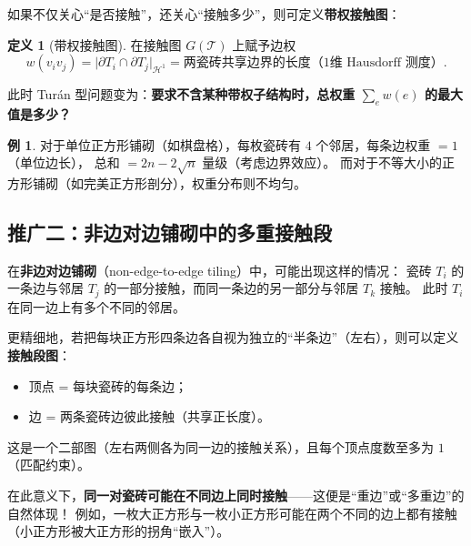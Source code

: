 \documentclass[12pt,a4paper]{article}
\theoremstyle{plain}
\theoremstyle{definition}
\newtheorem{definition}[theorem]{定义}
\newtheorem{example}[theorem]{例}
\theoremstyle{remark}
\begin{document}
如果不仅关心``是否接触''，还关心``接触多少''，则可定义\textbf{带权接触图}：
\begin{definition}[带权接触图]
在接触图 $G(\mathcal{T})$ 上赋予边权
\[
w(v_i v_j) = \big|\partial T_i \cap \partial T_j\big|_{\mathcal{H}^1}
= \text{两瓷砖共享边界的长度（1维 Hausdorff 测度）}.
\]
\end{definition}

此时 Turán 型问题变为：\textbf{要求不含某种带权子结构时，总权重 $\sum_e w(e)$ 的最大值是多少？}

\begin{example}
对于单位正方形铺砌（如棋盘格），每枚瓷砖有 $4$ 个邻居，每条边权重 $=1$（单位边长），
总和 $= 2n - 2\sqrt{n}$ 量级（考虑边界效应）。
而对于不等大小的正方形铺砌（如完美正方形剖分），权重分布则不均匀。
\end{example}

\subsection{推广二：非边对边铺砌中的多重接触段}

在\textbf{非边对边铺砌}（non-edge-to-edge tiling）中，可能出现这样的情况：
瓷砖 $T_i$ 的一条边与邻居 $T_j$ 的一部分接触，而同一条边的另一部分与邻居 $T_k$ 接触。
此时 $T_i$ 在同一边上有多个不同的邻居。

更精细地，若把每块正方形四条边各自视为独立的``半条边''（左右），则可以定义\textbf{接触段图}：
\begin{itemize}
    \item 顶点 = 每块瓷砖的每条边；
    \item 边 = 两条瓷砖边彼此接触（共享正长度）。
\end{itemize}
这是一个二部图（左右两侧各为同一边的接触关系），且每个顶点度数至多为 $1$（匹配约束）。

在此意义下，\textbf{同一对瓷砖可能在不同边上同时接触}——这便是``重边''或``多重边''的自然体现！
例如，一枚大正方形与一枚小正方形可能在两个不同的边上都有接触（小正方形被大正方形的拐角``嵌入''）。

\begin{center}
\end{center}
\end{document}
